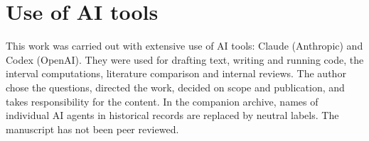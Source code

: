 \documentclass[a4paper,11pt]{article}
\begin{document}
\section*{Use of AI tools}
This work was carried out with extensive use of AI tools: Claude
(Anthropic) and Codex (OpenAI). They were used for drafting text,
writing and running code, the interval computations, literature
comparison and internal reviews. The author chose the questions,
directed the work, decided on scope and publication, and takes
responsibility for the content. In the companion archive, names of
individual AI agents in historical records are replaced by neutral
labels. The manuscript has not been peer reviewed.
\appendix


\end{document}
